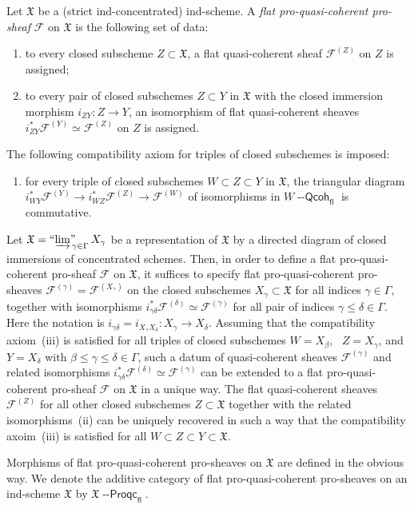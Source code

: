 \documentclass[12pt,a4paper]{amsart}
\newcommand{\+}{\protect\nobreakdash-}
\renewcommand{\:}{\colon}
\newcommand{\rarrow}{\longrightarrow}
\newcommand{\Qcoh}{{\operatorname{\mathsf{--Qcoh}}}}
\newcommand{\Proqc}{{\operatorname{\mathsf{--Proqc}}}}
\newcommand{\fl}{\mathsf{fl}}
\newcommand{\ilim}
 {\mathop{\text{\normalfont``$\varinjlim$''\!\!}}\nolimits}
\newcommand{\fX}{\mathfrak X}
\newcommand{\rF}{\mathscr F}
\theoremstyle{plain}
\theoremstyle{definition}
\begin{document}
 Let $\fX$ be a (strict ind-concentrated) ind-scheme.
 A \emph{flat pro-quasi-coherent pro-sheaf} $\rF$ on $\fX$ is
the following set of data:
\begin{enumerate}
\renewcommand{\theenumi}{\roman{enumi}}
\item to every closed subscheme $Z\subset\fX$, a flat quasi-coherent
sheaf $\rF^{(Z)}$ on $Z$ is assigned;
\item to every pair of closed subschemes $Z\subset Y$ in $\fX$ with
the closed immersion morphism $i_{ZY}\:Z\rarrow Y$, an isomorphism
of flat quasi-coherent sheaves $i_{ZY}^*\rF^{(Y)}\simeq\rF^{(Z)}$
on $Z$ is assigned.
\end{enumerate}
 The following compatibility axiom for triples of closed subschemes
is imposed:
\begin{enumerate}
\renewcommand{\theenumi}{\roman{enumi}}
\setcounter{enumi}{2}
\item for every triple of closed subschemes $W\subset Z\subset Y$
in $\fX$, the triangular diagram $i_{WY}^*\rF^{(Y)}\rarrow
i_{WZ}^*\rF^{(Z)}\rarrow\rF^{(W)}$ of isomorphisms in $W\Qcoh_\fl$
is commutative.
\end{enumerate}

 Let $\fX=\ilim_{\gamma\in\Gamma}X_\gamma$ be a representation of $\fX$
by a directed diagram of closed immersions of concentrated schemes.
 Then, in order to define a flat pro-quasi-coherent pro-sheaf $\rF$
on $\fX$, it suffices to specify flat pro-quasi-coherent pro-sheaves
$\rF^{(\gamma)}=\rF^{(X_\gamma)}$ on the closed subschemes
$X_\gamma\subset\fX$ for all indices $\gamma\in\Gamma$, together with
isomorphisms $i^*_{\gamma\delta}\rF^{(\delta)}\simeq\rF^{(\gamma)}$
for all pair of indices $\gamma\le\delta\in\Gamma$.
 Here the notation is $i_{\gamma\delta}=i_{X_\gamma X_\delta}\:
X_\gamma\rarrow X_\delta$.
 Assuming that the compatibility axiom~(iii) is satisfied for all
triples of closed subschemes $W=X_\beta$, \ $Z=X_\gamma$, and
$Y=X_\delta$ with $\beta\le\gamma\le\delta\in\Gamma$, such a datum
of quasi-coherent sheaves $\rF^{(\gamma)}$ and related isomorphisms
$i^*_{\gamma\delta}\rF^{(\delta)}\simeq\rF^{(\gamma)}$ can be extended
to a flat pro-quasi-coherent pro-sheaf $\rF$ on $\fX$ in a unique way.
 The flat quasi-coherent sheaves $\rF^{(Z)}$ for all other closed
subschemes $Z\subset\fX$ together with the related isomorphisms~(ii)
can be uniquely recovered in such a way that the compatibility
axoim~(iii) is satisfied for all $W\subset Z\subset Y\subset\fX$.

 Morphisms of flat pro-quasi-coherent pro-sheaves on $\fX$ are defined
in the obvious way.
 We denote the additive category of flat pro-quasi-coherent pro-sheaves
on an ind-scheme $\fX$ by $\fX\Proqc_\fl$.
\end{document}
